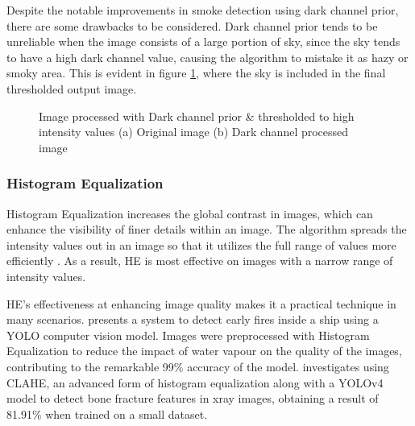 \documentclass[lettersize,journal]{IEEEtran}
\begin{document}
Despite the notable improvements in smoke detection using dark channel
prior, there are some drawbacks to be considered. Dark channel prior
tends to be unreliable when the image consists of a large portion of
sky, since the sky tends to have a high dark channel value, causing the
algorithm to mistake it as hazy or smoky area. This is evident in
figure \ref{dcp}, where the sky is included in the final
thresholded output image.

\begin{figure}
        \centering
        \hfil
        \caption{Image processed with Dark channel prior \& thresholded to high
        intensity values (a) Original image (b) Dark channel processed image}
        \label{dcp}
\end{figure}

\subsubsection{Histogram Equalization}

Histogram Equalization increases the global contrast in images, which
can enhance the visibility of finer details within an image. The
algorithm spreads the intensity values out in an image so that it
utilizes the full range of values more efficiently \cite{he}. As a
result, HE is most effective on images with a narrow range of intensity
values.

HE's effectiveness at enhancing image quality makes it a practical
technique in many scenarios. \cite{shipfirehe} presents a system to
detect early fires inside a ship using a YOLO computer vision model.
Images were preprocessed with Histogram Equalization to reduce the
impact of water vapour on the quality of the images, contributing to the
remarkable 99\% accuracy of the model. \cite{xrayhe} investigates using
CLAHE, an advanced form of histogram equalization along with a YOLOv4
model to detect bone fracture features in xray images, obtaining a
result of 81.91\% when trained on a small dataset.
\end{document}
